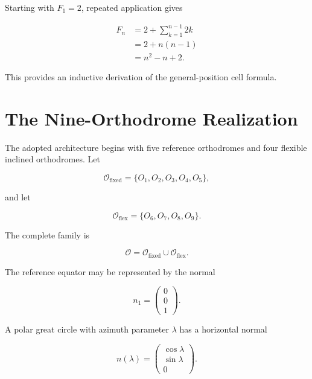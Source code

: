 \documentclass[11pt,fleqn]{book}
\numberwithin{equation}{chapter}
\theoremstyle{plain}
\theoremstyle{definition}
\theoremstyle{remark}
\newcommand{\Oset}{\mathcal{O}}
\begin{document}
Starting with \(F_1=2\), repeated application gives

\begin{align}
F_n
&=
2+\sum_{k=1}^{n-1}2k
\\
&=
2+n(n-1)
\\
&=
n^2-n+2.
\end{align}

This provides an inductive derivation of the general-position cell formula.

\section{The Nine-Orthodrome Realization}
\label{sec:nine-orthodrome-realization}

The adopted architecture begins with five reference orthodromes and four flexible inclined orthodromes. Let

\begin{equation}
    \Oset_{\mathrm{fixed}}
    =
    \{O_1,O_2,O_3,O_4,O_5\},
\end{equation}

and let

\begin{equation}
    \Oset_{\mathrm{flex}}
    =
    \{O_6,O_7,O_8,O_9\}.
\end{equation}

The complete family is

\begin{equation}
    \Oset
    =
    \Oset_{\mathrm{fixed}}
    \cup
    \Oset_{\mathrm{flex}}.
\end{equation}

The reference equator may be represented by the normal

\begin{equation}
    n_1
    =
    \begin{pmatrix}
      0\\0\\1
    \end{pmatrix}.
\end{equation}

A polar great circle with azimuth parameter \(\lambda\) has a horizontal normal

\begin{equation}
    n(\lambda)
    =
    \begin{pmatrix}
      \cos\lambda\\
      \sin\lambda\\
      0
    \end{pmatrix}.
\end{equation}
\end{document}
